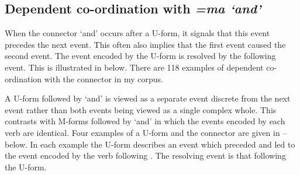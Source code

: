 \subsection{Dependent co-ordination with \it{=ma} `and'}\label{sec:Coo=Ma}
When the connector  `and' occurs after a U-form,
it signals that this event precedes the next event.
This often also implies that the first event caused the second event.
The event encoded by the U-form is resolved by the following event.
This is illustrated in  below.
There are 118 examples of dependent co-ordination
with the connector  in my corpus.

\begin{exe}\let\eachwordone=\textnormal
	\label{ex:=ma}
\end{exe}

A U-form followed by  `and'
is viewed as a separate event discrete from the next event
rather than both events being viewed as a single complex whole.
This contrasts with M-forms followed by  `and'
in which the events encoded by each verb are identical.
Four examples of a U-form and the connector 
are given in -- below.
In each example the U-form describes an event which
preceded and led to the event encoded by the verb following .
The resolving event is that following the U-form.

